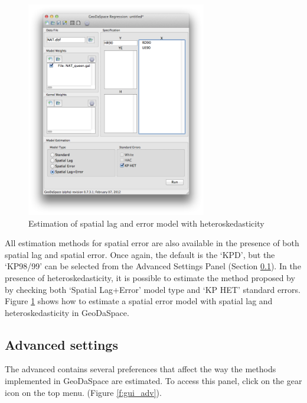 \documentclass{article}
\begin{document}
\begin{figure}[htb]
\centering
\caption{Estimation of spatial lag and error model with heteroskedasticity}
\label{f:GS_het_combo}
\includegraphics[width=0.7\textwidth]{GS_het_combo.png}
\end{figure}

All estimation methods for spatial error are also available in the presence of both spatial lag and spatial error. Once again, the default is the `KPD', but the `KP98/99' can be selected from the Advanced Settings Panel (Section \ref{s:adv}). In the presence of heteroskedasticity, it is possible to estimate the method proposed by \citet{Arraiz10} by checking both `Spatial Lag+Error' model type and `KP HET' standard errors. Figure \ref{f:GS_het_combo} shows how to estimate a spatial error model with spatial lag and heteroskedasticity in GeoDaSpace.
\FloatBarrier


\subsection{Advanced settings}
\label{s:adv}


The advanced contains several preferences that affect the way the methods implemented in GeoDaSpace are estimated. To access this panel, click on the gear icon on the top menu. (Figure \ref{f:gui_adv}).
 
\end{document}
